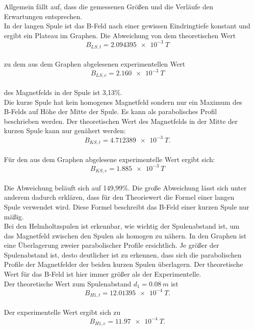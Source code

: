 Allgemein fällt auf, dass die gemessenen Größen und die Verläufe den Erwartungen entsprechen.
\\In der langen Spule ist das B-Feld nach einer gewissen Eindringtiefe konstant und ergibt ein Plateau im Graphen.
Die Abweichung von dem theoretischen Wert
\begin{equation*}
  B_{LS, t} = \SI{2.094395e-3}{T}
\end{equation*}
\\zu dem aus dem Graphen abgelesenen experimentellen Wert
\begin{equation*}
  B_{LS, e} = \SI{2.160e-3}{T}
\end{equation*}
\\des Magnetfelds in der Spule ist 3,13\%.
\\Die kurze Spule hat kein homogenes Magnetfeld sondern nur ein Maximum des B-Felds auf Höhe der Mitte der Spule.
Es kann als parabolisches Profil beschrieben werden.
Der theoretischen Wert des Magnetfelds in der Mitte der kurzen Spule kann nur genähert werden:
\begin{equation*}
  B_{KS, t} = \SI{4.712389e-3}{T}.
\end{equation*}
\\Für den aus dem Graphen abgelesene experimentelle Wert ergibt sich:
\begin{equation*}
  B_{KS, e} = \SI{1.885e-3}{T}
\end{equation*}
\\Die Abweichung beläuft sich auf 149,99\%.
Die große Abweichung lässt sich unter anderem dadurch erklären, dass für den Theoriewert die Formel einer langen Spule verwendet wird.
Diese Formel beschreibt das B-Feld einer kurzen Spule nur mäßig.
\\Bei den Helmholtzspulen ist erkennbar, wie wichtig der Spulenabstand ist, um das Magnetfeld zwischen den Spulen als homogen zu nähern.
In den Graphen ist eine Überlagerung zweier parabolischer Profile ersichtlich.
Je größer der Spulenabstand ist, desto deutlicher ist zu erkennen, dass sich die parabolischen Profile der Magnetfelder der beiden kurzen Spulen überlagern.
Der theoretische Wert für das B-Feld ist hier immer größer als der Experimentelle.
\\Der theoretische Wert zum Spulenabstand $d_{1}=\SI{0.08}{m}$ ist
\begin{equation*}
  B_{H1, t} = \SI{12.01395e-4}{T}.
\end{equation*}
\\Der experimentelle Wert ergibt sich zu
\begin{equation*}
  B_{H1, e} = \SI{11.97e-4}{T}.
\end{equation*}
